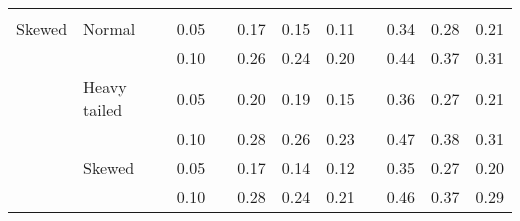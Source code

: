 \begin{table}[ht]
\begin{scriptsize}
\begin{tabular}{ll p{.1cm} c p{.1cm} rrr p{.1cm} rrr}
             &&&&&&&&&&&\\
Skewed       & Normal       && 0.05 &&  0.17 & 0.15 & 0.11 && 0.34 & 0.28 & 0.21 \\ 
             &              && 0.10 &&  0.26 & 0.24 & 0.20 && 0.44 & 0.37 & 0.31 \\ 
             & Heavy tailed && 0.05 &&  0.20 & 0.19 & 0.15 && 0.36 & 0.27 & 0.21 \\ 
             &              && 0.10 &&  0.28 & 0.26 & 0.23 && 0.47 & 0.38 & 0.31 \\ 
             & Skewed       && 0.05 &&  0.17 & 0.14 & 0.12 && 0.35 & 0.27 & 0.20 \\ 
             &              && 0.10 &&  0.28 & 0.24 & 0.21 && 0.46 & 0.37 & 0.29 \\

\hline
\end{tabular}
\end{scriptsize}
\end{table}


